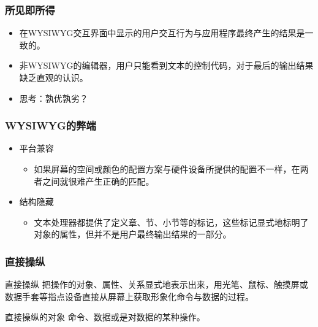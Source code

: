 \documentclass{beamer}
\newcommand{\fullPageImage}[2]{
	{
		\usebackgroundtemplate{\texttt{[image: \#1]}}
		\frame[plain]{#2}
	}
}
\begin{document}
\fullPageImage{images/redcons-fullpreview1-600x356.jpg}{\transwipe}

\begin{frame}
	\frametitle{所见即所得}
	\beamertemplatetransparentcovereddynamicmedium
	\begin{itemize}[<+->]
		\item 在WYSIWYG交互界面中显示的用户交互行为与应用程序最终产生的结果是一致的。 
		\item 非WYSIWYG的编辑器，用户只能看到文本的控制代码，对于最后的输出结果缺乏直观的认识。
		\item 思考：孰优孰劣？
	\end{itemize}
\end{frame}

\begin{frame}
	\frametitle{WYSIWYG的弊端}
	\beamertemplatetransparentcovereddynamicmedium
	\begin{itemize}[<+->]
		\item 平台兼容
		\begin{itemize}
			\item 如果屏幕的空间或颜色的配置方案与硬件设备所提供的配置不一样，在两者之间就很难产生正确的匹配。
		\end{itemize}
		\item 结构隐藏
		\begin{itemize}
			\item 文本处理器都提供了定义章、节、小节等的标记，这些标记显式地标明了对象的属性，但并不是用户最终输出结果的一部分。
		\end{itemize}
	\end{itemize}
\end{frame}

\fullPageImage{images/texmakertop_big.jpg}{\transwipe}

\begin{frame}
	\frametitle{直接操纵}
	\beamertemplatetransparentcovereddynamicmedium
	\begin{beamerboxesrounded}[shadow=true]{直接操纵}
	把操作的对象、属性、关系显式地表示出来，用光笔、鼠标、触摸屏或数据手套等指点设备直接从屏幕上获取形象化命令与数据的过程。
	\end{beamerboxesrounded}
	\pause
	\begin{beamerboxesrounded}[shadow=true]{直接操纵的对象}
	命令、数据或是对数据的某种操作。
	\end{beamerboxesrounded}
\end{frame}
\end{document}
